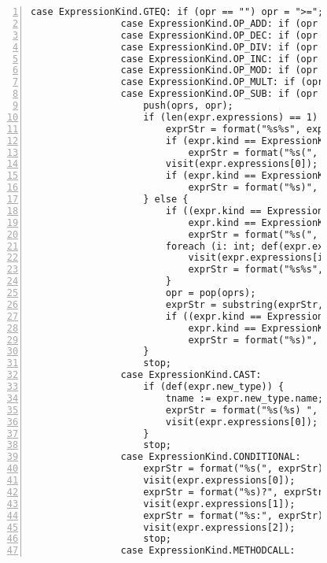 \begin{figure}[ht!]
\begin{lstlisting}[numbers=left, tabsize=4, escapechar=@, caption={API Usage Mining Analysis},label={lst:aun-code}, lastline = 10]
                case ExpressionKind.GTEQ: if (opr == "") opr = ">=";
                case ExpressionKind.OP_ADD: if (opr == "") opr = "+";
                case ExpressionKind.OP_DEC: if (opr == "") opr = "--";
                case ExpressionKind.OP_DIV: if (opr == "") opr = "/"; 
                case ExpressionKind.OP_INC: if (opr == "") opr = "++"; 
                case ExpressionKind.OP_MOD: if (opr == "") opr = "%"; 
                case ExpressionKind.OP_MULT: if (opr == "") opr = "*";
                case ExpressionKind.OP_SUB: if (opr == "") opr = "-";
                    push(oprs, opr);
                    if (len(expr.expressions) == 1) {
                        exprStr = format("%s%s", exprStr, pop(oprs));
                        if (expr.kind == ExpressionKind.LOGICAL_NOT)
                            exprStr = format("%s(", exprStr);
                        visit(expr.expressions[0]);
                        if (expr.kind == ExpressionKind.LOGICAL_NOT)
                            exprStr = format("%s)", exprStr);
                    } else {
                        if ((expr.kind == ExpressionKind.ASSIGN && isPP) ||
                            expr.kind == ExpressionKind.LOGICAL_NOT) 
                            exprStr = format("%s(", exprStr);
                        foreach (i: int; def(expr.expressions[i])) {
                            visit(expr.expressions[i]);
                            exprStr = format("%s%s", exprStr, peek(oprs));
                        }
                        opr = pop(oprs);
                        exprStr = substring(exprStr, 0, (len(exprStr)-len(opr)));
                        if ((expr.kind == ExpressionKind.ASSIGN && isPP) ||
                            expr.kind == ExpressionKind.LOGICAL_NOT) 
                            exprStr = format("%s)", exprStr);
                    }
		            stop;
                case ExpressionKind.CAST:
                    if (def(expr.new_type)) {
                        tname := expr.new_type.name;
                        exprStr = format("%s(%s) ", exprStr, tname);
                        visit(expr.expressions[0]); 
                    }
                    stop;
                case ExpressionKind.CONDITIONAL:
                    exprStr = format("%s(", exprStr);
                    visit(expr.expressions[0]);
                    exprStr = format("%s)?", exprStr);
                    visit(expr.expressions[1]);
                    exprStr = format("%s:", exprStr);
                    visit(expr.expressions[2]);
                    stop;
                case ExpressionKind.METHODCALL:

\end{lstlisting}
\end{figure}
